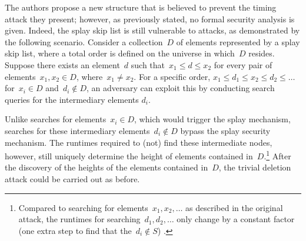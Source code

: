 The authors propose a new structure that is believed to prevent the timing attack they present; however, as previously stated, no formal security analysis is given. 
Indeed, the splay skip list is still vulnerable to attacks, as demonstrated by the following scenario. Consider a collection~$D$ of elements represented by a splay skip list, where a total order is defined on the universe in which~$D$ resides. Suppose there exists an element~\( d \) such that~\( x_1 \leq d \leq x_2 \) for every pair of elements~\( x_1, x_2 \in D \), where~$x_1 \neq x_2$. For a specific order, $x_1 \leq d_1 \leq x_2 \leq d_2 \leq \ldots$ for~$x_i \in D$ and~$d_i \notin D$, an adversary can exploit this by conducting search queries for the intermediary elements $d_i$. 

Unlike searches for elements~$x_i \in D$, which would trigger the splay mechanism, searches for these intermediary elements~$d_i \not\in D$ bypass the splay security mechanism. The runtimes required to (not) find these intermediate nodes, however, still uniquely determine the height of elements contained in~$D$.\footnote{Compared to searching for elements~$x_1,x_2,\ldots$ as described in the original attack, the runtimes for searching~$d_1,d_2,\ldots$ only change by a constant factor (one extra step to find that the~$d_i \not\in S$) .} After the discovery of the heights of the elements contained in~$D$, the trivial deletion attack could be carried out as before.